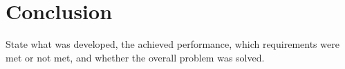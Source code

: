\section{Conclusion}

State what was developed,
the achieved performance, which requirements were met or not met, 
and whether the overall problem was solved. 